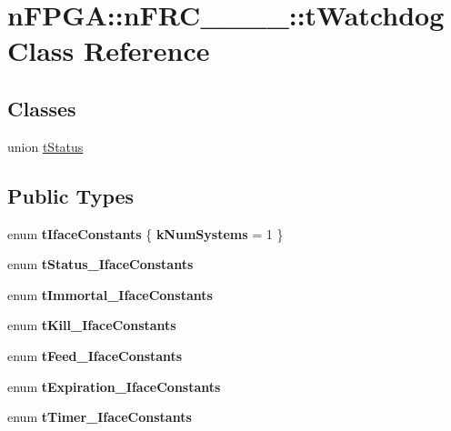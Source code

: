 \hypertarget{classnFPGA_1_1nFRC__2012__1__6__4_1_1tWatchdog}{
\section{nFPGA::nFRC\_\_\_\_::tWatchdog Class Reference}
\label{classnFPGA_1_1nFRC__2012__1__6__4_1_1tWatchdog}
}
\subsection*{Classes}
\begin{DoxyCompactItemize}
\item 
union \hyperlink{unionnFPGA_1_1nFRC__2012__1__6__4_1_1tWatchdog_1_1tStatus}{tStatus}
\end{DoxyCompactItemize}
\subsection*{Public Types}
\begin{DoxyCompactItemize}
\item 
enum {\bfseries tIfaceConstants} \{ {\bfseries kNumSystems} =  1
 \}
\item 
enum {\bfseries tStatus\_\-IfaceConstants} 
\item 
enum {\bfseries tImmortal\_\-IfaceConstants} 
\item 
enum {\bfseries tKill\_\-IfaceConstants} 
\item 
enum {\bfseries tFeed\_\-IfaceConstants} 
\item 
enum {\bfseries tExpiration\_\-IfaceConstants} 
\item 
enum {\bfseries tTimer\_\-IfaceConstants} 
\end{DoxyCompactItemize}
